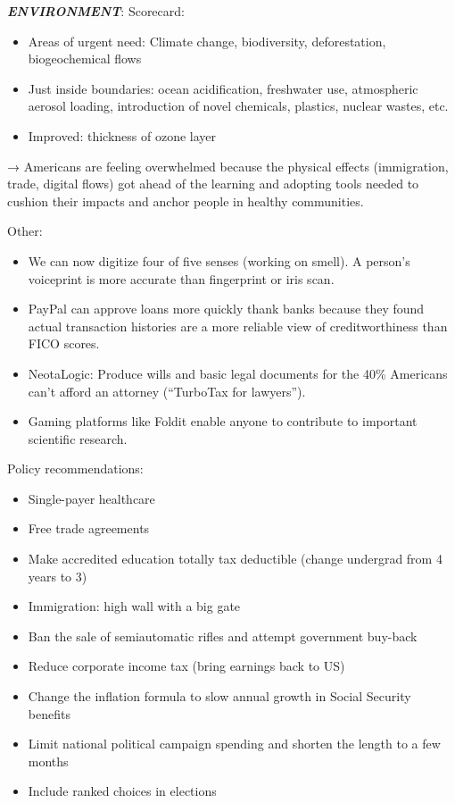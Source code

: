 \documentclass[
]{article}
\begin{document}
\textbf{\emph{ENVIRONMENT}}: Scorecard:

\begin{itemize}
\item
  Areas of urgent need: Climate change, biodiversity, deforestation,
  biogeochemical flows
\item
  Just inside boundaries: ocean acidification, freshwater use,
  atmospheric aerosol loading, introduction of novel chemicals,
  plastics, nuclear wastes, etc.
\item
  Improved: thickness of ozone layer
\end{itemize}

→ Americans are feeling overwhelmed because the physical effects
(immigration, trade, digital flows) got ahead of the learning and
adopting tools needed to cushion their impacts and anchor people in
healthy communities.

Other:

\begin{itemize}
\item
  We can now digitize four of five senses (working on smell). A person's
  voiceprint is more accurate than fingerprint or iris scan.
\item
  PayPal can approve loans more quickly thank banks because they found
  actual transaction histories are a more reliable view of
  creditworthiness than FICO scores.
\item
  NeotaLogic: Produce wills and basic legal documents for the 40\%
  Americans can't afford an attorney (``TurboTax for lawyers'').
\item
  Gaming platforms like Foldit enable anyone to contribute to important
  scientific research.
\end{itemize}

Policy recommendations:

\begin{itemize}
\item
  Single-payer healthcare
\item
  Free trade agreements
\item
  Make accredited education totally tax deductible (change undergrad
  from 4 years to 3)
\item
  Immigration: high wall with a big gate
\item
  Ban the sale of semiautomatic rifles and attempt government buy-back
\item
  Reduce corporate income tax (bring earnings back to US)
\item
  Change the inflation formula to slow annual growth in Social Security
  benefits
\item
  Limit national political campaign spending and shorten the length to a
  few months
\item
  Include ranked choices in elections
\end{itemize}
\end{document}
